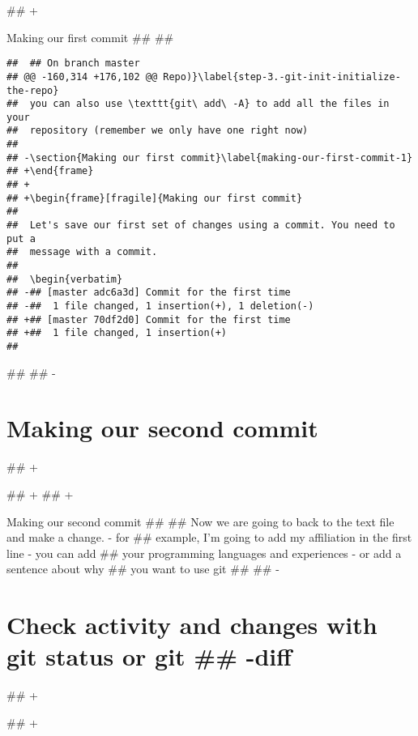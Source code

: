 \documentclass[ignorenonframetext,]{beamer}
\begin{document}
## +\begin{frame}[fragile]{Making our first commit}
##  
##  \begin{verbatim}
##  ## On branch master
## @@ -160,314 +176,102 @@ Repo)}\label{step-3.-git-init-initialize-the-repo}
##  you can also use \texttt{git\ add\ -A} to add all the files in your
##  repository (remember we only have one right now)
##  
## -\section{Making our first commit}\label{making-our-first-commit-1}
## +\end{frame}
## +
## +\begin{frame}[fragile]{Making our first commit}
##  
##  Let's save our first set of changes using a commit. You need to put a
##  message with a commit.
##  
##  \begin{verbatim}
## -## [master adc6a3d] Commit for the first time
## -##  1 file changed, 1 insertion(+), 1 deletion(-)
## +## [master 70df2d0] Commit for the first time
## +##  1 file changed, 1 insertion(+)
##  \end{verbatim}
##  
## -\section{Making our second commit}\label{making-our-second-commit}
## +\end{frame}
## +
## +\begin{frame}{Making our second commit}
##  
##  Now we are going to back to the text file and make a change. - for
##  example, I'm going to add my affiliation in the first line - you can add
##  your programming languages and experiences - or add a sentence about why
##  you want to use git
##  
## -\section{Check activity and changes with git status or git
## -diff}\label{check-activity-and-changes-with-git-status-or-git-diff}
## +\end{frame}
## +
\end{document}
